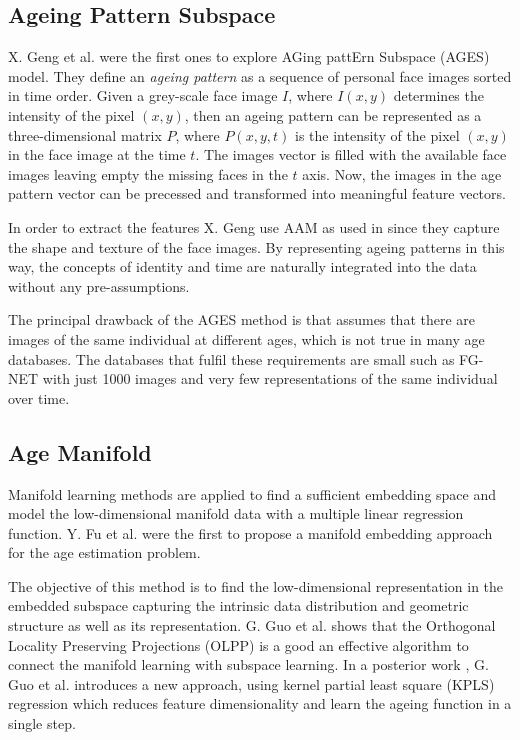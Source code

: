 \subsection{Ageing Pattern Subspace}\label{subsec:APS}

X. Geng et al. \cite{4359348, Geng:2006:LFA:1180639.1180711} were the first ones to explore AGing pattErn Subspace (AGES) model. They define an \textit{ageing pattern} as a sequence of personal face images sorted in time order. Given a grey-scale face image $I$, where $I(x,y)$ determines the intensity of the pixel $(x,y)$, then an ageing pattern can be represented as a three-dimensional matrix $P$, where $P(x,y,t)$ is the intensity of the pixel $(x,y)$ in the face image at the time $t$. The images vector is filled with the available face images leaving empty the missing faces in the $t$ axis. Now, the images in the age pattern vector can be precessed and transformed into meaningful feature vectors.

In order to extract the features X. Geng use AAM as used in \cite{791208} since they capture the shape and texture of the face images. By representing ageing patterns in this way, the concepts of identity and time are naturally integrated into the data without any pre-assumptions.

The principal drawback of the AGES method is that assumes that there are images of the same individual at different ages, which is not true in many age databases. The databases that fulfil these requirements are small such as FG-NET \cite{FGNET} with just 1000 images and very few representations of the same individual over time.

\subsection{Age Manifold}\label{subsec:manifold}
 
Manifold learning methods are applied to find a sufficient embedding space and model the low-dimensional manifold data with a multiple linear regression function. Y. Fu et al. \cite{4523958, 4284917} were the first to propose a manifold embedding approach for the age estimation problem. 

The objective of this method is to find the low-dimensional representation in the embedded subspace capturing the intrinsic data distribution and geometric structure as well as its representation. G. Guo et al. \cite{Guo:2008:IHA:2319085.2321608} \cite{4531189} shows that the Orthogonal Locality Preserving Projections (OLPP) \cite{CHHZ06}  is a good an effective algorithm  to connect the manifold learning with subspace learning. In a posterior work \cite{5995404}, G. Guo et al. introduces a new approach, using kernel partial least square (KPLS) regression which reduces feature dimensionality and learn the ageing function in a single step.

